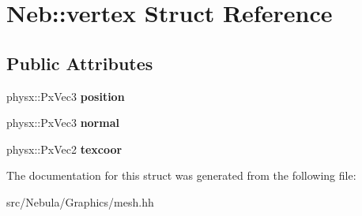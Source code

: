 \hypertarget{structNeb_1_1vertex}{\section{Neb\-:\-:vertex Struct Reference}
\label{structNeb_1_1vertex}
}
\subsection*{Public Attributes}
\begin{DoxyCompactItemize}
\item 
\hypertarget{structNeb_1_1vertex_a102cf356b8ec3aaa0b97b17d7f9895d2}{physx\-::\-Px\-Vec3 {\bfseries position}}\label{structNeb_1_1vertex_a102cf356b8ec3aaa0b97b17d7f9895d2}

\item 
\hypertarget{structNeb_1_1vertex_a00870a556673b983336f03f46a20c0b2}{physx\-::\-Px\-Vec3 {\bfseries normal}}\label{structNeb_1_1vertex_a00870a556673b983336f03f46a20c0b2}

\item 
\hypertarget{structNeb_1_1vertex_a5bed2aa1a57abd7f0df560e45c4a1802}{physx\-::\-Px\-Vec2 {\bfseries texcoor}}\label{structNeb_1_1vertex_a5bed2aa1a57abd7f0df560e45c4a1802}

\end{DoxyCompactItemize}


The documentation for this struct was generated from the following file\-:\begin{DoxyCompactItemize}
\item 
src/\-Nebula/\-Graphics/mesh.\-hh\end{DoxyCompactItemize}
